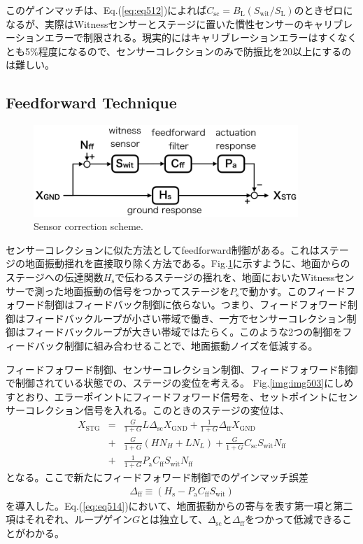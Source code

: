 このゲインマッチは、Eq.(\ref{eq:eq512})によれば$C_{\mathrm{sc}}=B_{\mathrm{L}}(S_{\mathrm{wit}}/S_{\mathrm{L}})$のときゼロになるが、実際はWitnessセンサーとステージに置いた慣性センサーのキャリブレーションエラーで制限される。現実的にはキャリブレーションエラーはすくなくとも5\%程度になるので、センサーコレクションのみで防振比を20以上にするのは難しい\cite{hua2005low}。


\subsection{Feedforward Technique}
\begin{figure}[h]
  \begin{center}   
    \includegraphics[width=10cm]{./img_chap5/img506.png}
    \caption{Sensor correction scheme.} \label{img:img506}
  \end{center}
\end{figure}
センサーコレクションに似た方法としてfeedforward制御がある。これはステージの地面振動揺れを直接取り除く方法である。Fig.\ref{img:img506}に示すように、地面からのステージへの伝達関数$H_{\mathrm{s}}$で伝わるステージの揺れを、地面においたWitnessセンサーで測った地面振動の信号をつかってステージを$P_{\mathrm{s}}$で動かす。このフィードフォワード制御はフィードバック制御に依らない。つまり、フィードフォワード制御はフィードバックループが小さい帯域で働き、一方でセンサーコレクション制御はフィードバックループが大きい帯域ではたらく。このような2つの制御をフィードバック制御に組み合わせることで、地面振動ノイズを低減する。

フィードフォワード制御、センサーコレクション制御、フィードフォワード制御で制御されている状態での、ステージの変位を考える。
Fig.\ref{img:img503}にしめすとおり、エラーポイントにフィードフォワード信号を、セットポイントにセンサーコレクション信号を入れる。このときのステージの変位は、
\begin{eqnarray}\nonumber
  X_{\mathrm{STG}} &=&\frac{G}{1+G}L\Delta_{\mathrm{sc}} X_{\mathrm{GND}} + \frac{1}{1+G} \Delta_{\mathrm{ff}} X_{\mathrm{GND}}\\ \nonumber
  &+& \frac{G}{1+G}\left(HN_{H}+LN_{L}\right) + \frac{G}{1+G}C_{\mathrm{sc}}S_{\mathrm{wit}}N_{\mathrm{ff}} \\ 
  &+& \frac{1}{1+G}P_{\mathrm{a}} C_{\mathrm{ff}}S_{\mathrm{wit}}N_{\mathrm{ff}} \label{eq:eq514}
\end{eqnarray}
となる。ここで新たにフィードフォワード制御でのゲインマッチ誤差
\begin{eqnarray}
  \Delta_{\mathrm{ff}} \equiv \left(H_{\mathrm{s}}-P_{\mathrm{a}}C_{\mathrm{ff}}S_{\mathrm{wit}}\right) \label{eq:eq515}
\end{eqnarray}
を導入した。Eq.(\ref{eq:eq514})において、地面振動からの寄与を表す第一項と第二項はそれぞれ、ループゲイン$G$とは独立して、$\Delta_{\mathrm{sc}}$と$\Delta_{\mathrm{ff}}$をつかって低減できることがわかる。


